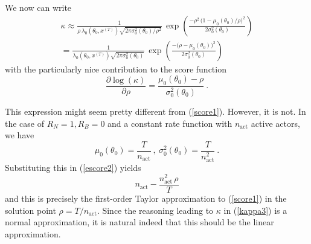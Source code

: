 \documentclass[a4paper,12pt,fleqn]{article}
\begin{document}
\begin{appendices}
We now can write
\begin{multline}
\kappa  \approx    \frac{1}{\rho\,\lambda_0(\theta_0, x^{(T)})
                \sqrt{2\pi \sigma_0^2(\theta_0)/\rho^2}}
              \, \exp\left( \frac{-\rho^2\,
              \big(1 -\mu_0(\theta_0)/\rho\big)^2}{2\sigma_0^2(\theta_0)}\right) \\
       =  \frac{1}{\lambda_0(\theta_0, x^{(T)})
                \sqrt{2\pi \sigma_0^2(\theta_0)}}
              \, \exp\left( \frac{-\big(\rho - \mu_0(\theta_0)\big)^2}{2\sigma_0^2(\theta_0)}\right)
\end{multline}
with the particularly nice contribution to the score function
\begin{equation}
   \frac{\partial \log(\kappa)}{\partial \rho} =
             \frac{ \mu_0(\theta_0) - \rho}{\sigma_0^2(\theta_0)} \ . \label{escore2}
\end{equation}

This expression might seem pretty different from (\ref{score1}).
However, it is not. In the case of $R_N=1, R_B=0$ and a constant rate function
with $n_{\text{act}}$ active actors, we have
\[
 \mu_0(\theta_0) = \frac{T}{n_{\text{act}}} \ ,\  \sigma_0^2(\theta_0) =
 \frac{T}{n_{\text{act}}^2} \ .
\]
Substituting this in (\ref{escore2}) yields
\[
  n_{\text{act}} - \frac{n_{\text{act}}^2\,\rho}{T}
\]
and this is precisely the first-order Taylor approximation
to (\ref{score1}) in the solution point $\rho = T/{n_{\text{act}}}$.
Since the reasoning leading to $\kappa$ in (\ref{kappa3}) is a normal
approximation, it is natural indeed that this should be the linear approximation.
\fi


\end{appendices}



\end{document}
